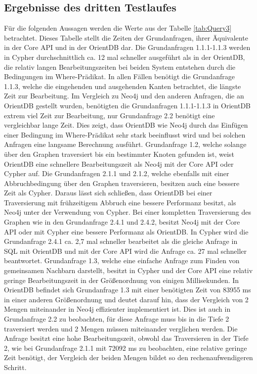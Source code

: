 \subsection{Ergebnisse des dritten Testlaufes}
Für die folgenden Aussagen werden die Werte aus der Tabelle \ref{tab:Query3}  betrachtet. Dieses Tabelle stellt die Zeiten der Grundanfragen, ihrer Äquivalente in der Core API und in der OrientDB dar. \newline
Die Grundanfragen 1.1.1-1.1.3 werden in Cypher durchschnittlich ca. 12 mal schneller ausgeführt als in der OrientDB, die relativ langen Bearbeitungszeiten bei beiden System entstehen durch die Bedingungen im Where-Prädikat. In allen Fällen benötigt die Grundanfrage 1.1.3, welche die eingehenden und ausgehenden Kanten betrachtet, die längste Zeit zur Bearbeitung. Im Vergleich zu Neo4j und den anderen Anfragen, die an OrientDB gestellt wurden, benötigten die Grundanfragen 1.1.1-1.1.3 in OrientDB extrem viel Zeit zur Bearbeitung, nur Grundanfrage 2.2 benötigt eine vergleichbar lange Zeit. Dies zeigt, dass OrientDB wie Neo4j durch das Einfügen einer Bedingung im Where-Prädikat sehr stark beeinflusst wird und bei solchen Anfragen eine langsame Berechnung ausführt. \newline
 Grundanfrage 1.2, welche solange über den Graphen traversiert bis ein bestimmter Knoten gefunden ist, weist OrientDB eine schnellere Bearbeitungszeit als Neo4j mit der Core API oder Cypher auf. Die Grundanfragen 2.1.1 und 2.1.2, welche ebenfalls mit einer Abbruchbedingung über den Graphen traversieren, besitzen auch eine bessere Zeit als Cypher. Daraus lässt sich schließen, dass OrientDB  bei einer Traversierung mit frühzeitigem Abbruch eine bessere Performanz besitzt, als Neo4j unter der Verwendung von Cypher. Bei einer kompletten Traversierung des Graphen wie in den Grundanfrage 2.4.1 und 2.4.2, besitzt Neo4j mit der Core API oder mit Cypher eine bessere Performanz als OrientDB. In Cypher wird die Grundanfrage 2.4.1 ca. 2,7 mal schneller bearbeitet als die gleiche Anfrage in SQL mit OrientDB und mit der Core API wird die Anfrage ca. 27 mal schneller beantwortet. \newline
Grundanfrage 1.3, welche eine einfache Anfrage zum Finden von gemeinsamen Nachbarn darstellt, besitzt in Cypher und der Core API eine relativ geringe Bearbeitungszeit in der Größenordnung von einigen Millisekunden. In OrientDB befindet sich Grundanfrage 1.3 mit einer benötigten Zeit von 83955 ms in einer anderen Größenordnung und deutet darauf hin, dass der Vergleich von 2 Mengen miteinander in Neo4j effizienter implementiert ist. Dies ist auch in Grundanfrage 2.2 zu beobachten, für diese Anfrage muss bis in die Tiefe 2 traversiert werden und 2 Mengen müssen miteinander verglichen werden. Die Anfrage besitzt eine hohe Bearbeitungszeit, obwohl das Traversieren in der Tiefe 2, wie bei Grundanfrage 2.1.1 mit 72092 ms zu beobachten, eine relative geringe Zeit benötigt, der Vergleich der beiden Mengen bildet so den rechenaufwendigeren Schritt. \newline
